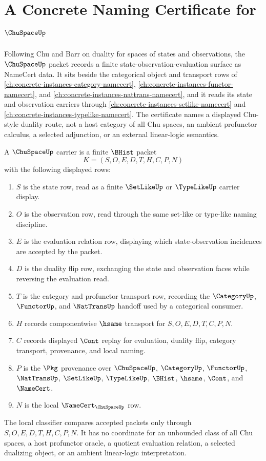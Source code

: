\chapter{A Concrete Naming Certificate for $\ChuSpaceUp$}
\label{ch:concrete-instances-chu-space-namecert}

Following Chu and Barr on duality for spaces of states and observations, the $\ChuSpaceUp$ packet records a finite state-observation-evaluation surface as NameCert data. It sits beside the categorical object and transport rows of \autoref{ch:concrete-instances-category-namecert}, \autoref{ch:concrete-instances-functor-namecert}, and \autoref{ch:concrete-instances-nattrans-namecert}, and it reads its state and observation carriers through \autoref{ch:concrete-instances-setlike-namecert} and \autoref{ch:concrete-instances-typelike-namecert}. The certificate names a displayed Chu-style duality route, not a host category of all Chu spaces, an ambient profunctor calculus, a selected adjunction, or an external linear-logic semantics.

\begin{definition}
\label{def:chu-space-carrier}
A $\ChuSpaceUp$ carrier is a finite $\BHist$ packet
$$
K=(S,O,E,D,T,H,C,P,N)
$$
with the following displayed rows:
\begin{enumerate}
\item $S$ is the state row, read as a finite $\SetLikeUp$ or $\TypeLikeUp$ carrier display.
\item $O$ is the observation row, read through the same set-like or type-like naming discipline.
\item $E$ is the evaluation relation row, displaying which state-observation incidences are accepted by the packet.
\item $D$ is the duality flip row, exchanging the state and observation faces while reversing the evaluation read.
\item $T$ is the category and profunctor transport row, recording the $\CategoryUp$, $\FunctorUp$, and $\NatTransUp$ handoff used by a categorical consumer.
\item $H$ records componentwise $\hsame$ transport for $S,O,E,D,T,C,P,N$.
\item $C$ records displayed $\Cont$ replay for evaluation, duality flip, category transport, provenance, and local naming.
\item $P$ is the $\Pkg$ provenance over $\ChuSpaceUp$, $\CategoryUp$, $\FunctorUp$, $\NatTransUp$, $\SetLikeUp$, $\TypeLikeUp$, $\BHist$, $\hsame$, $\Cont$, and $\NameCert$.
\item $N$ is the local $\NameCert_{\ChuSpaceUp}$ row.
\end{enumerate}
The local classifier compares accepted packets only through $S,O,E,D,T,H,C,P,N$. It has no coordinate for an unbounded class of all Chu spaces, a host profunctor oracle, a quotient evaluation relation, a selected dualizing object, or an ambient linear-logic interpretation.
\end{definition}

